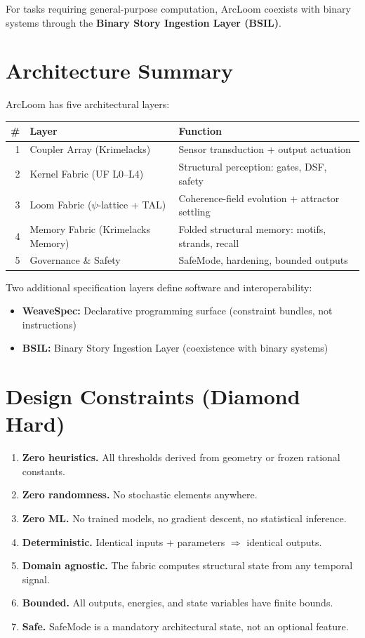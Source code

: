 \documentclass[11pt, a4paper]{report}
\begin{document}
For tasks requiring general-purpose computation, ArcLoom coexists with
binary systems through the \textbf{Binary Story Ingestion Layer (BSIL)}.

\section{Architecture Summary}

ArcLoom has five architectural layers:

\begin{center}
\begin{tabular}{@{}rll@{}}
\toprule
\textbf{\#} & \textbf{Layer} & \textbf{Function} \\
\midrule
1 & Coupler Array (Krimelacks) & Sensor transduction + output actuation \\
2 & Kernel Fabric (UF L0--L4) & Structural perception: gates, DSF, safety \\
3 & Loom Fabric ($\psi$-lattice + TAL) & Coherence-field evolution + attractor settling \\
4 & Memory Fabric (Krimelacks Memory) & Folded structural memory: motifs, strands, recall \\
5 & Governance \& Safety & SafeMode, hardening, bounded outputs \\
\bottomrule
\end{tabular}
\end{center}

Two additional specification layers define software and interoperability:
\begin{itemize}[nosep]
  \item \textbf{WeaveSpec:} Declarative programming surface (constraint
        bundles, not instructions)
  \item \textbf{BSIL:} Binary Story Ingestion Layer (coexistence with
        binary systems)
\end{itemize}

\section{Design Constraints (Diamond Hard)}

\begin{enumerate}[label=DC-\arabic*.]
  \item \textbf{Zero heuristics.} All thresholds derived from geometry
        or frozen rational constants.
  \item \textbf{Zero randomness.} No stochastic elements anywhere.
  \item \textbf{Zero ML.} No trained models, no gradient descent, no
        statistical inference.
  \item \textbf{Deterministic.} Identical inputs + parameters $\Rightarrow$
        identical outputs.
  \item \textbf{Domain agnostic.} The fabric computes structural state
        from any temporal signal.
  \item \textbf{Bounded.} All outputs, energies, and state variables have
        finite bounds.
  \item \textbf{Safe.} SafeMode is a mandatory architectural state, not
        an optional feature.
\end{enumerate}
\end{document}
